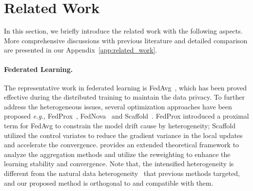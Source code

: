 \documentclass{article} %
\theoremstyle{plain}
\theoremstyle{definition}
\theoremstyle{remark}
\begin{document}




\section{Related Work}

In this section, we briefly introduce the related work with the following aspects. More comprehensive discussions with previous literature and detailed comparison are presented in our Appendix~\ref{app:related_work}.

\paragraph{Federated Learning.}
The representative work in federated learning is FedAvg~\citep{mcmahan2017communication}, which has been proved effective during the distributed training to maintain the data privacy. To further address the heterogeneous issues, several optimization approaches have been proposed \textit{\textit{e.g.,}} FedProx~\citep{li2018federated}, FedNova~\citep{wang2020tackling} and Scaffold~\citep{karimireddy2020scaffold}. FedProx introduced a proximal term for FedAvg to constrain the model drift cause by heterogeneity; Scaffold utilized the control variates to reduce the gradient variance in the local updates and accelerate the convergence. %
\citet{mansour2022federated} provides an extended theoretical framework to analyze the aggregation methods and utilize the reweighting to enhance the learning stability and convergence.
Note that, the intensified heterogeneity is different from the natural data heterogeneity~\citep{li2019convergence} that previous methods targeted, and our proposed method is orthogonal to and compatible with them.
\end{document}
